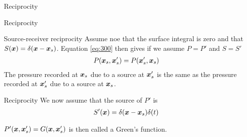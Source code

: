 \documentclass[xcolor=dvipsnames,notes]{beamer}
\begin{document}
\begin{frame}{Reciprocity}
\begin{figure}
\end{figure}
\end{frame}
\begin{frame}{Reciprocity}
\begin{figure}
\end{figure}
\end{frame}
\begin{frame}{Source-receiver reciprocity}
Assume noe that the surface integral is zero 
and that $S(\mbox{\boldmath $x$}) = \delta(\mbox{\boldmath $x$}-\mbox{\boldmath $x$}_s)$. Equation \eqref{eq:300} then gives
if we assume $P=P'$ and $S=S'$
\begin{eqnarray}
   P(\mbox{\boldmath $x$}_s,\mbox{\boldmath $x$}'_s) =P(\mbox{\boldmath $x$}'_s,\mbox{\boldmath $x$}_s) 
\end{eqnarray}
The pressure recorded at $\mbox{\boldmath $x$}_s$ due to a source at $\mbox{\boldmath $x$}'_s$ is
the same as the pressure recorded at $\mbox{\boldmath $x$}'_s$ due to a source at $\mbox{\boldmath $x$}_s$.
\end{frame}
\begin{frame}{Reciprocity}
We now assume that the source of $P'$ is
\begin{eqnarray}
 S'(\mbox{\boldmath $x$}) = \delta(\mbox{\boldmath $x$}-\mbox{\boldmath $x$}_s)\delta(t)
\end{eqnarray}

$P'(\mbox{\boldmath $x$},\mbox{\boldmath $x$}'_s) = G(\mbox{\boldmath $x$},\mbox{\boldmath $x$}'_s)$ is then 
called a Green's function.
\end{frame}
\end{document}
